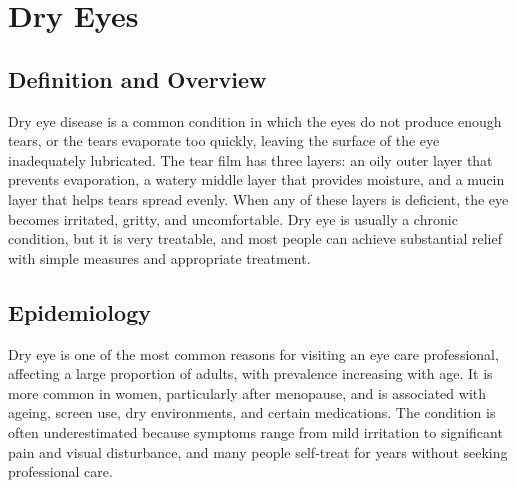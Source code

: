 \chapter{Dry Eyes}

\section*{Definition and Overview}
Dry eye disease is a common condition in which the eyes do not produce enough tears, or the tears evaporate too quickly, leaving the surface of the eye inadequately lubricated. The tear film has three layers: an oily outer layer that prevents evaporation, a watery middle layer that provides moisture, and a mucin layer that helps tears spread evenly. When any of these layers is deficient, the eye becomes irritated, gritty, and uncomfortable. Dry eye is usually a chronic condition, but it is very treatable, and most people can achieve substantial relief with simple measures and appropriate treatment.

\section*{Epidemiology}
Dry eye is one of the most common reasons for visiting an eye care professional, affecting a large proportion of adults, with prevalence increasing with age. It is more common in women, particularly after menopause, and is associated with ageing, screen use, dry environments, and certain medications. The condition is often underestimated because symptoms range from mild irritation to significant pain and visual disturbance, and many people self-treat for years without seeking professional care.

